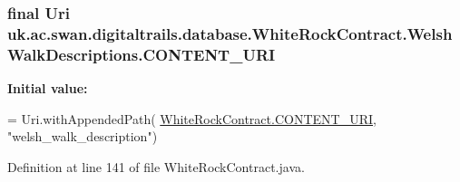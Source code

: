 \hypertarget{classuk_1_1ac_1_1swan_1_1digitaltrails_1_1database_1_1_white_rock_contract_1_1_welsh_walk_descriptions_aabfc760037e8b4181add4e0b022ca055}{
\subsubsection[{C\+O\+N\+T\+E\+N\+T\+\_\+\+U\+R\+I}]{\setlength{\rightskip}{0pt plus 5cm}final Uri uk.\+ac.\+swan.\+digitaltrails.\+database.\+White\+Rock\+Contract.\+Welsh\+Walk\+Descriptions.\+C\+O\+N\+T\+E\+N\+T\+\_\+\+U\+R\+I\hspace{0.3cm}{\ttfamily [static]}}}\label{classuk_1_1ac_1_1swan_1_1digitaltrails_1_1database_1_1_white_rock_contract_1_1_welsh_walk_descriptions_aabfc760037e8b4181add4e0b022ca055}
{\bfseries Initial value\+:}
\begin{DoxyCode}
= Uri.withAppendedPath(
                \hyperlink{classuk_1_1ac_1_1swan_1_1digitaltrails_1_1database_1_1_white_rock_contract_abfe96759bfe16773a98099536eef2306}{WhiteRockContract.CONTENT\_URI}, \textcolor{stringliteral}{"welsh\_walk\_description"})
\end{DoxyCode}


Definition at line 141 of file White\+Rock\+Contract.\+java.

